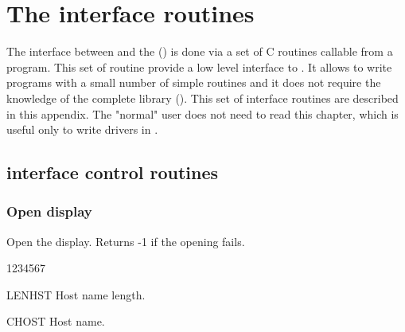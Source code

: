 \chapter{The \XW{} interface routines}

The interface between \HIGZ{} and the \XW{} () is done via a set of C
routines callable from a \FORTRAN{} program. This set of routine provide a low
level interface to . It allows to write  programs with a small number
of simple routines and it does not require the knowledge of the complete 
library (\XLIB). This set of interface routines are described in this appendix.
The "normal" \HIGZ{} user does not need to read this chapter, which is useful
only to write  drivers in \FORTRAN.

\section{ interface control routines}
\subsection{Open  display}
\Action
Open the display. Returns -1 if the opening fails.
\Pdesc
\begin{DLtt}{1234567}
\item[LENHST] Host name length.
\item[CHOST] Host name.
\end{DLtt}
